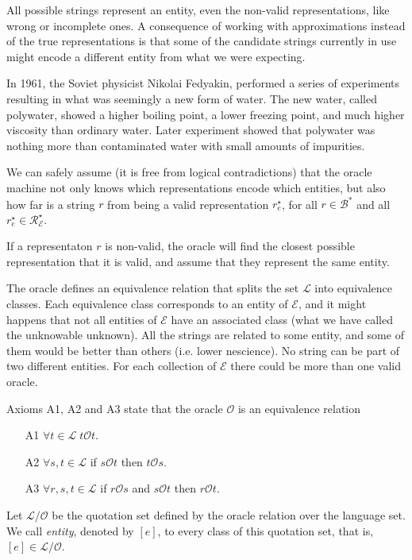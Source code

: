 All possible strings represent an entity, even the non-valid representations, like wrong or incomplete ones. A consequence of working with approximations instead of the true representations is that some of the candidate strings currently in use might encode a different entity from what we were expecting.

\begin{example}
\label{ex:polywater}
In 1961, the Soviet physicist Nikolai Fedyakin, performed a series of experiments resulting in what was seemingly a new form of water. The new water, called polywater, showed a higher boiling point, a lower freezing point, and much higher viscosity than ordinary water. Later experiment showed that polywater was nothing more than contaminated water with small amounts of impurities.
\end{example}

{\color{red}

We can safely assume (it is free from logical contradictions) that the oracle machine not only knows which representations encode which entities, but also how far is a string $r$ from being a valid representation $r^\star_e$, for all $r \in \mathcal{B}^\ast$ and all $r^\star_e \in \mathcal{R}^\star_\mathcal{E}$. 

If a representaton $r$ is non-valid, the oracle will find the closest possible representation that it is valid, and assume that they represent the same entity.

The oracle defines an equivalence relation that splits the set $\mathcal{L}$ into equivalence classes. Each equivalence class corresponds to an entity of $\mathcal{E}$, and it might happens that not all entities of $\mathcal{E}$ have an associated class (what we have called the unknowable unknown). All the strings are related to some entity, and some of them would be better than others (i.e. lower nescience). No string can be part of two different entities. For each collection of $\mathcal{E}$ there could be more than one valid oracle.

\begin{proposition}
Axioms A1, A2 and A3 state that the oracle $\mathcal{O}$ is an equivalence relation
\begin{itemize}
\item[A1] $\forall t \in \mathcal{L} \; t \mathcal{O} t$.
\item[A2] $\forall s , t \in \mathcal{L}$ if $s \mathcal{O} t$ then $t \mathcal{O} s$.
\item[A3] $\forall r, s , t \in \mathcal{L}$ if $r \mathcal{O} s$ and $s \mathcal{O} t$ then $r \mathcal{O} t$.
\end{itemize}
\end{proposition}

\begin{definition}
Let $\mathcal{L} / \mathcal{O}$ be the quotation set defined by the oracle relation over the language set. We call \emph{entity}, denoted by $[e]$, to every class of this quotation set, that is, $[e] \in \mathcal{L} / \mathcal{O}$.
\end{definition}

}

